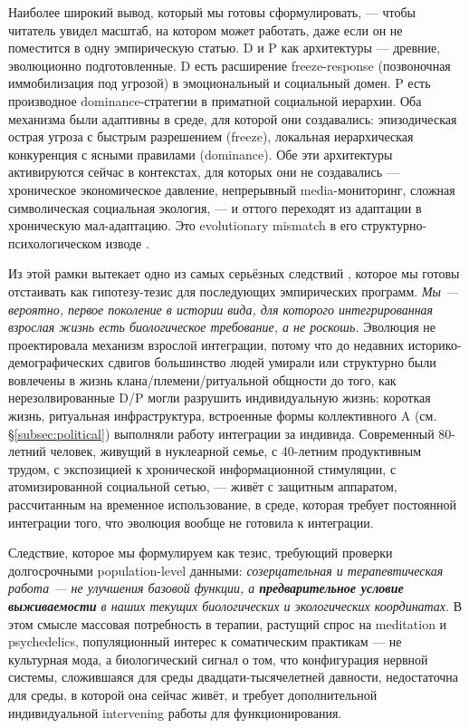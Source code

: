 Наиболее широкий вывод, который мы готовы сформулировать, --- чтобы читатель увидел масштаб, на котором \DEIC{} может работать, даже если он не поместится в одну эмпирическую статью. D и P как архитектуры --- древние, эволюционно подготовленные. D есть расширение freeze-response (позвоночная иммобилизация под угрозой) в эмоциональный и социальный домен. P есть производное dominance-стратегии в приматной социальной иерархии. Оба механизма были адаптивны в среде, для которой они создавались: эпизодическая острая угроза с быстрым разрешением (freeze), локальная иерархическая конкуренция с ясными правилами (dominance). Обе эти архитектуры активируются сейчас в контекстах, для которых они не создавались --- хроническое экономическое давление, непрерывный media-мониторинг, сложная символическая социальная экология, --- и оттого переходят из адаптации в хроническую мал-адаптацию. Это evolutionary mismatch в его структурно-психологическом изводе \citep[в духе][]{lieberman2013, sapolsky2017}.

Из этой рамки вытекает одно из самых серьёзных следствий \DEIC{}, которое мы готовы отстаивать как гипотезу-тезис для последующих эмпирических программ. \emph{Мы --- вероятно, первое поколение в истории вида, для которого интегрированная взрослая жизнь есть биологическое требование, а не роскошь.} Эволюция не проектировала механизм взрослой интеграции, потому что до недавних историко-демографических сдвигов большинство людей умирали или структурно были вовлечены в жизнь клана/племени/ритуальной общности до того, как нерезолвированные D/P могли разрушить индивидуальную жизнь; короткая жизнь, ритуальная инфраструктура, встроенные формы коллективного A (см. §\ref{subsec:political}) выполняли работу интеграции за индивида. Современный 80-летний человек, живущий в нуклеарной семье, с 40-летним продуктивным трудом, с экспозицией к хронической информационной стимуляции, с атомизированной социальной сетью, --- живёт с защитным аппаратом, рассчитанным на временное использование, в среде, которая требует постоянной интеграции того, что эволюция вообще не готовила к интеграции.

Следствие, которое мы формулируем как тезис, требующий проверки долгосрочными population-level данными: \emph{созерцательная и терапевтическая работа --- не улучшения базовой функции, а \textbf{предварительное условие выживаемости} в наших текущих биологических и экологических координатах}. В этом смысле массовая потребность в терапии, растущий спрос на meditation и psychedelics, популяционный интерес к соматическим практикам --- не культурная мода, а биологический сигнал о том, что конфигурация нервной системы, сложившаяся для среды двадцати-тысячелетней давности, недостаточна для среды, в которой она сейчас живёт, и требует дополнительной индивидуальной intervening работы для функционирования.

